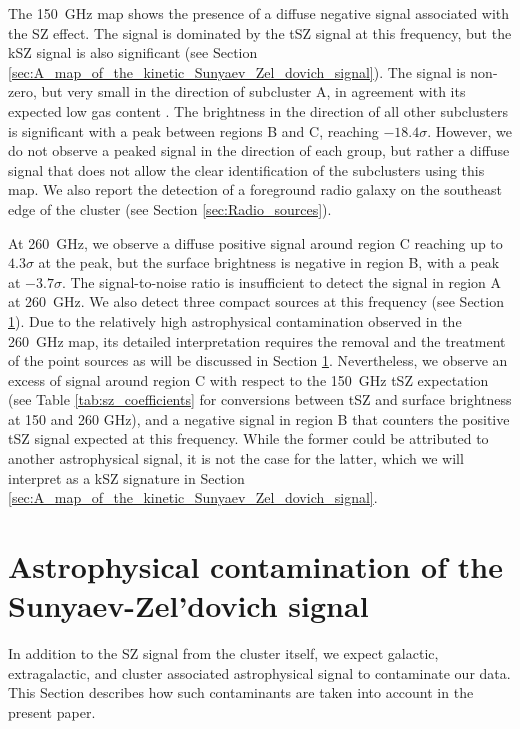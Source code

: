 \documentclass[twocolumn,traditabstract]{aa}
\begin{document}
The 150~GHz map shows the presence of a diffuse negative signal associated with the SZ effect. The signal is dominated by the tSZ signal at this frequency, but the kSZ signal is also significant (see Section \ref{sec:A_map_of_the_kinetic_Sunyaev_Zel_dovich_signal}). The signal is non-zero, but very small in the direction of subcluster A, in agreement with its expected low gas content \citep[see][]{Ma2009}. The brightness in the direction of all other subclusters is significant with a peak between regions B and C, reaching $-18.4 \sigma$. However, we do not observe a peaked signal in the direction of each group, but rather a diffuse signal that does not allow the clear identification of the subclusters using this map. We also report the detection of a foreground radio galaxy on the southeast edge of the cluster (see Section \ref{sec:Radio_sources}).

At 260~GHz, we observe a diffuse positive signal around region C reaching up to $4.3 \sigma$ at the peak, but the surface brightness is negative in region B, with a peak at $-3.7 \sigma$. The signal-to-noise ratio is insufficient to detect the signal in region A at 260~GHz. We also detect three compact sources at this frequency (see Section \ref{sec:astrophysical_contamination_of_the_Sunyaev_Zel_dovich_signal}). Due to the relatively high astrophysical contamination observed in the 260~GHz map, its detailed interpretation requires the removal and the treatment of the point sources as will be discussed in Section \ref{sec:astrophysical_contamination_of_the_Sunyaev_Zel_dovich_signal}. Nevertheless, we observe an excess of signal around region C with respect to the 150~GHz tSZ expectation (see Table \ref{tab:sz_coefficients} for conversions between tSZ and surface brightness at 150 and 260 GHz), and a negative signal in region B that counters the positive tSZ signal expected at this frequency. While the former could be attributed to another astrophysical signal, it is not the case for the latter, which we will interpret as a kSZ signature in Section \ref{sec:A_map_of_the_kinetic_Sunyaev_Zel_dovich_signal}.

\section{Astrophysical contamination of the Sunyaev-Zel'dovich signal}\label{sec:astrophysical_contamination_of_the_Sunyaev_Zel_dovich_signal}
In addition to the SZ signal from the cluster itself, we expect galactic, extragalactic, and cluster associated astrophysical signal to contaminate our data. This Section describes how such contaminants are taken into account in the present paper.
\end{document}
